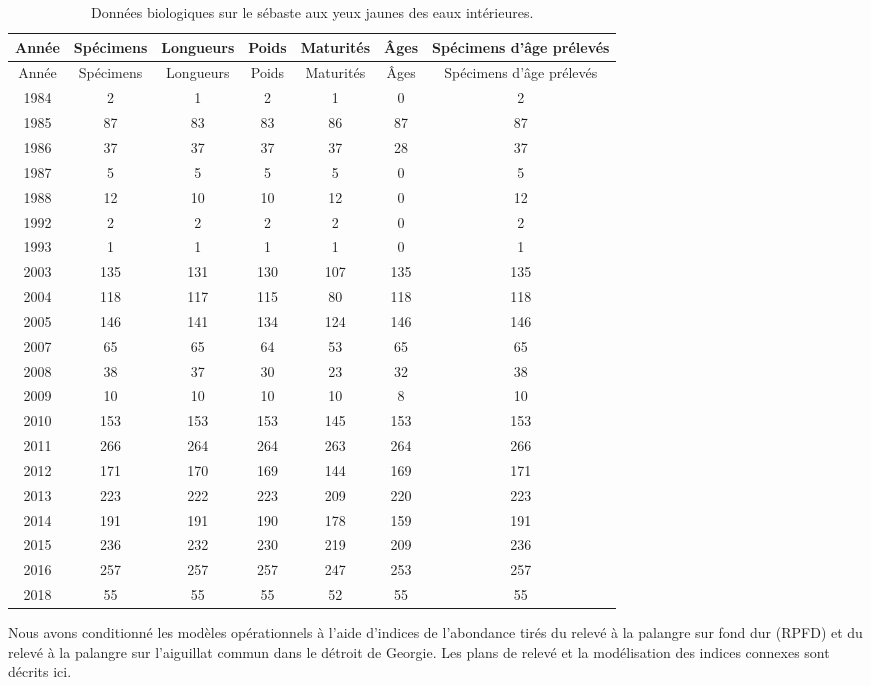 \documentclass[11pt]{book}
\begin{document}
\hypertarget{summary-table-of-biological-data-available}{%
\label{summary-table-of-biological-data-available}}
\begin{longtable}[]{@{}ccccccc@{}}
\caption{\label{tab:test}Données biologiques sur le sébaste aux yeux jaunes des eaux intérieures.}\tabularnewline
\toprule
Année & Spécimens & Longueurs & Poids & Maturités & Âges & Spécimens d'âge prélevés\tabularnewline
\midrule
\endfirsthead
\toprule
Année & Spécimens & Longueurs & Poids & Maturités & Âges & Spécimens d'âge prélevés\tabularnewline
\midrule
\endhead
1984 & 2 & 1 & 2 & 1 & 0 & 2\tabularnewline
1985 & 87 & 83 & 83 & 86 & 87 & 87\tabularnewline
1986 & 37 & 37 & 37 & 37 & 28 & 37\tabularnewline
1987 & 5 & 5 & 5 & 5 & 0 & 5\tabularnewline
1988 & 12 & 10 & 10 & 12 & 0 & 12\tabularnewline
1992 & 2 & 2 & 2 & 2 & 0 & 2\tabularnewline
1993 & 1 & 1 & 1 & 1 & 0 & 1\tabularnewline
2003 & 135 & 131 & 130 & 107 & 135 & 135\tabularnewline
2004 & 118 & 117 & 115 & 80 & 118 & 118\tabularnewline
2005 & 146 & 141 & 134 & 124 & 146 & 146\tabularnewline
2007 & 65 & 65 & 64 & 53 & 65 & 65\tabularnewline
2008 & 38 & 37 & 30 & 23 & 32 & 38\tabularnewline
2009 & 10 & 10 & 10 & 10 & 8 & 10\tabularnewline
2010 & 153 & 153 & 153 & 145 & 153 & 153\tabularnewline
2011 & 266 & 264 & 264 & 263 & 264 & 266\tabularnewline
2012 & 171 & 170 & 169 & 144 & 169 & 171\tabularnewline
2013 & 223 & 222 & 223 & 209 & 220 & 223\tabularnewline
2014 & 191 & 191 & 190 & 178 & 159 & 191\tabularnewline
2015 & 236 & 232 & 230 & 219 & 209 & 236\tabularnewline
2016 & 257 & 257 & 257 & 247 & 253 & 257\tabularnewline
2018 & 55 & 55 & 55 & 52 & 55 & 55\tabularnewline
\bottomrule
\end{longtable}
\clearpage


\clearpage

\label{app:index-data}

Nous avons conditionné les modèles opérationnels à l'aide d'indices de l'abondance tirés du relevé à la palangre sur fond dur (RPFD) et du relevé à la palangre sur l'aiguillat commun dans le détroit de Georgie. Les plans de relevé et la modélisation des indices connexes sont décrits ici.

\hypertarget{sec:hbll-index-data}{%
\label{sec:hbll-index-data}}
\end{document}
